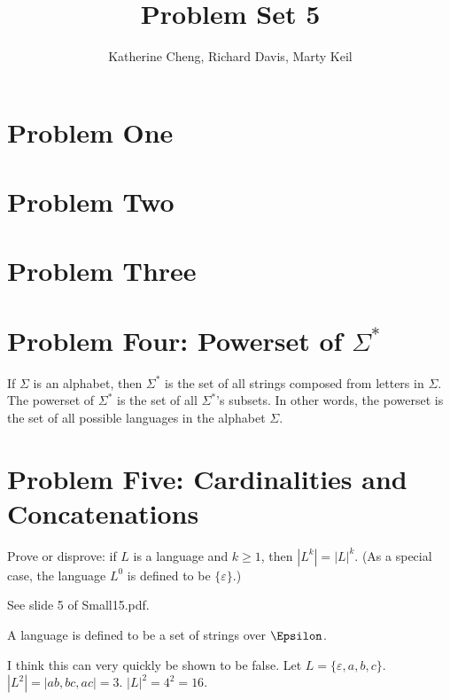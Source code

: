 \documentclass[10pt,letter]{article}
\begin{document}

\title{Problem Set 5}

\author{Katherine Cheng, Richard Davis, Marty Keil}

 
\maketitle 

\section*{Problem One}

\section*{Problem Two}

\section*{Problem Three}

\section*{Problem Four: Powerset of $\Sigma^*$}
If $\Sigma$ is an alphabet, then $\Sigma^*$ is the set of all strings composed from letters in $\Sigma$. The powerset of $\Sigma^*$ is the set of all $\Sigma^*$'s subsets. In other words, the powerset is the set of all possible languages in the alphabet $\Sigma$. 

\section*{Problem Five: Cardinalities and Concatenations}
Prove or disprove: if $L$ is a language and $k \ge 1$, then $|L^k| = |L|^k$. (As a special case, the language $L^0$ is defined to be $\{\varepsilon\}$.) 

See slide 5 of Small15.pdf.

A language is defined to be a set of strings over $\Epsilon$. 

I think this can very quickly be shown to be false. Let $L = \{\varepsilon, a, b, c\}$. $|L^2| = |{ab, bc, ac}| = 3$. $|L|^2 = 4^2 = 16$.
\end{document}
